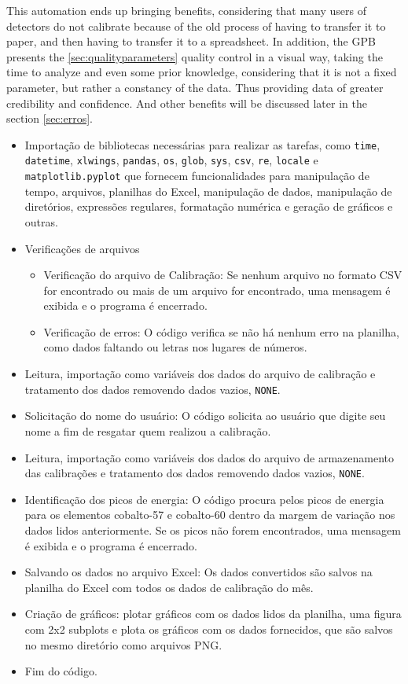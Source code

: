 \documentclass[fleqn,usenatbib]{rasti}
\begin{document}
This automation ends up bringing benefits, considering that many users of detectors do not calibrate because of the old process of having to transfer it to paper, and then having to transfer it to a spreadsheet. In addition, the GPB presents the \ref{sec:qualityparameters} quality control in a visual way, taking the time to analyze and even some prior knowledge, considering that it is not a fixed parameter, but rather a constancy of the data. Thus providing data of greater credibility and confidence. And other benefits will be discussed later in the section \ref{sec:erros}. 



\begin{itemize}
  \item Importação de bibliotecas necessárias para realizar as tarefas, como \texttt{time}, \texttt{datetime}, \texttt{xlwings}, \texttt{pandas}, \texttt{os}, \texttt{glob}, \texttt{sys}, \texttt{csv}, \texttt{re}, \texttt{locale} e \texttt{matplotlib.pyplot} que fornecem funcionalidades para manipulação de tempo, arquivos, planilhas do Excel, manipulação de dados, manipulação de diretórios, expressões regulares, formatação numérica e geração de gráficos e outras.
  \item Verificações de arquivos
    \begin{itemize}
      \item Verificação do arquivo de Calibração: Se nenhum arquivo no formato CSV for encontrado ou mais de um arquivo for encontrado, uma mensagem é exibida e o programa é encerrado.
      \item Verificação de erros: O código verifica se não há nenhum erro na planilha, como dados faltando ou letras nos lugares de números.
    \end{itemize}
  \item Leitura, importação como variáveis dos dados do arquivo de calibração e tratamento dos dados removendo dados vazios, \texttt{NONE}.
  \item Solicitação do nome do usuário: O código solicita ao usuário que digite seu nome a fim de resgatar quem realizou a calibração.
  \item Leitura, importação como variáveis dos dados do arquivo de armazenamento das calibrações e tratamento dos dados removendo dados vazios, \texttt{NONE}.
  \item Identificação dos picos de energia: O código procura pelos picos de energia para os elementos cobalto-57 e cobalto-60 dentro da margem de variação nos dados lidos anteriormente. Se os picos não forem encontrados, uma mensagem é exibida e o programa é encerrado.
  \item Salvando os dados no arquivo Excel: Os dados convertidos são salvos na planilha do Excel com todos os dados de calibração do mês.
  \item Criação de gráficos: plotar gráficos com os dados lidos da planilha, uma figura com 2x2 subplots e plota os gráficos com os dados fornecidos, que são salvos no mesmo diretório como arquivos PNG.
  \item Fim do código.
\end{itemize}
\end{document}
